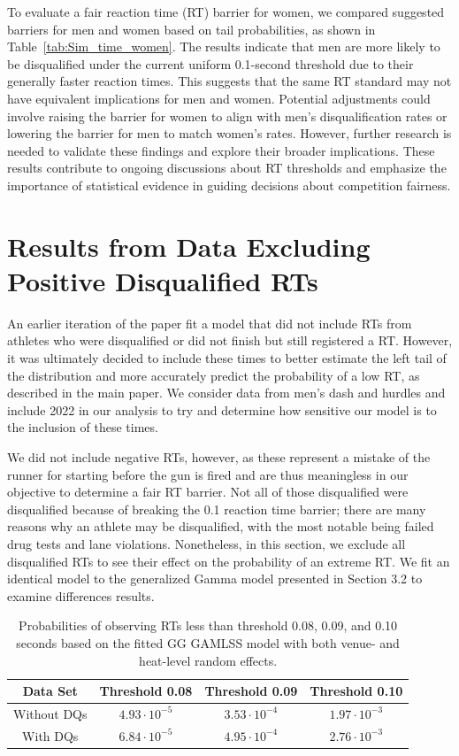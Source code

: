 \documentclass[12pt, letterpaper]{article}
\begin{document}
To evaluate a fair reaction time (RT) barrier for women, we compared suggested 
barriers for men and women based on tail probabilities, as shown in 
Table~\ref{tab:Sim_time_women}. The results indicate that men are more likely 
to be disqualified under the current uniform 0.1-second threshold due to their 
generally faster reaction times. This suggests that the same RT standard may not 
have equivalent implications for men and women. Potential adjustments could 
involve raising the barrier for women to align with men’s disqualification rates 
or lowering the barrier for men to match women’s rates. However, further research 
is needed to validate these findings and explore their broader implications. These 
results contribute to ongoing discussions about RT thresholds and emphasize the 
importance of statistical evidence in guiding decisions about competition fairness.


\section{Results from Data Excluding Positive Disqualified RTs}

An earlier iteration of the paper fit a model that did not include RTs from
athletes who were disqualified or did not finish but still registered a RT.  
However, it was ultimately decided to include these times to better estimate the 
left tail of the distribution and more accurately predict the probability of a 
low RT, as described in the main paper.  We consider data from men's dash and
hurdles and include 2022 in our analysis to try and determine how sensitive
our model is to the inclusion of these times.

We did not include negative RTs, however, as these represent a mistake of the
runner for starting before the gun is fired and are thus meaningless in our
objective to determine a fair RT barrier.  Not all of those disqualified were
disqualified because of breaking the 0.1 reaction time barrier; there are many
reasons why an athlete may be disqualified, with the most notable being failed
drug tests and lane violations.  Nonetheless, in this section,
we exclude all disqualified RTs to see their effect on the probability of an
extreme RT.  We fit an identical model to the generalized Gamma model
presented in Section 3.2 to examine differences results.



\begin{table}
  \centering
   \caption{Probabilities of observing RTs less than threshold 0.08,
   0.09, and 0.10 seconds based on the
     fitted GG GAMLSS model with both venue- and heat-level
 random effects.}
   \begin{tabular}{c c c c}
    \toprule
    Data Set & Threshold 0.08 & Threshold 0.09 & Threshold 0.10  \\
    \midrule
    Without DQs & $4.93\cdot10^{-5}$ & $3.53\cdot10^{-4}$ &  $1.97\cdot10^{-3}$  \\
    With DQs & $6.84\cdot10^{-5}$ & $4.95\cdot10^{-4}$ & $2.76\cdot10^{-3}$ \\
    \bottomrule
   \end{tabular}
   \label{tab:DQSim_probability}
 \end{table}
\end{document}

